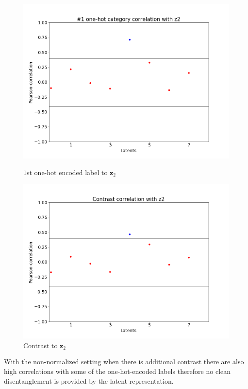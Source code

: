 \documentclass[12pt, english]{article}
\begin{document}
\vspace{4mm}

\begin{figure}[H]
\begin{minipage}{0.5\linewidth}
    \centering
    \includegraphics[width=.72\linewidth]{label-contrast-corr/cat-1-to-z2-corr.png} 
    \caption{$1$st one-hot encoded label to $\bm{z}_{2}$} 
    \label{fig:label-contrast-corr-1}
\end{minipage}%
\begin{minipage}{0.5\linewidth}
    \centering
    \includegraphics[width=.72\linewidth]{label-contrast-corr/contrast-to-z2-corr.png} 
    \caption{Contrast to $\bm{z}_{2}$} 
    \label{fig:label-contrast-corr-2}
\end{minipage} 
\end{figure}

\par With the non-normalized setting when there is additional contrast there are also high correlations with some of the one-hot-encoded labels therefore no clean disentanglement is provided by the latent representation.

\vspace{4mm}
\end{document}
